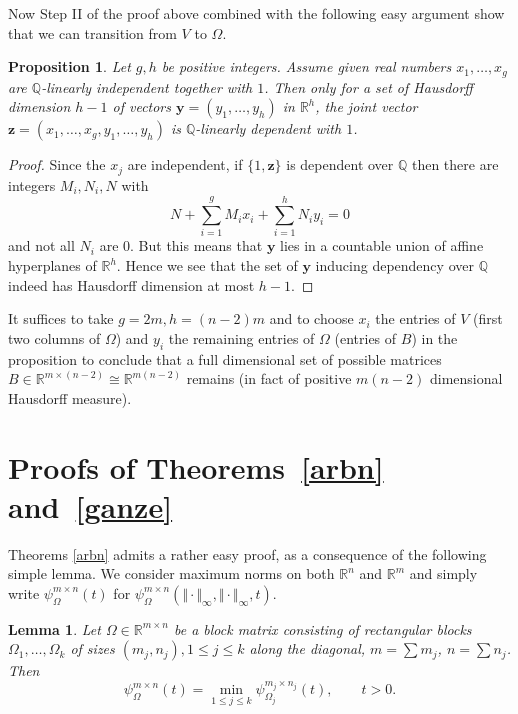 \documentclass[10pt]{amsart}
\newtheorem{lemma}[theorem]{Lemma}
\newtheorem{proposition}{Proposition}
\theoremstyle{definition}
\newcommand{\R}{\mathbb{R}}
\newcommand{\Q}{\mathbb{Q}}
\begin{document}
	Now Step II of the proof above combined with the
	following easy argument show that we can transition from $V$ to $\Omega$.
	
	\begin{proposition}  \label{p}
		Let $g, h$ be positive integers. Assume given real numbers
		$x_1, \ldots,x_g$ are $\Q$-linearly independent together with $1$. 
		Then only for a set of Hausdorff dimension $h-1$ of vectors
		$\boldsymbol{y}=(y_1,\ldots,y_h)$ in $\R^h$, the joint vector $\boldsymbol{z}=(x_1,\ldots,x_g,y_1,\ldots,y_h)$ is $\Q$-linearly dependent with $1$.
	\end{proposition}

\begin{proof}
	Since the $x_j$ are independent, if $\{ 1,\boldsymbol{z}\}$ is 
	dependent over $\Q$ then
	there are integers $M_i, N_i, N$ with
	\[
	N+ \sum_{i=1}^{g} M_i x_i +\sum_{i=1}^{h} N_i y_i = 0
	\]
	and not all $N_i$ are $0$. But this means that $\boldsymbol{y}$ lies
	in a countable union of affine hyperplanes of $\R^{h}$. Hence 
	we see that the set of $\boldsymbol{y}$ inducing dependency over $\Q$
	indeed has Hausdorff dimension at most $h-1$.
	\end{proof}
	
It suffices to take $g=2m, h=(n-2)m$ and to choose $x_i$ the entries of $V$ (first two columns of $\Omega$)
and $y_i$ the remaining entries of $\Omega$ (entries of $B$) in the proposition to conclude
that a full dimensional set of possible matrices $B\in \R^{m\times (n-2)}\cong \R^{m(n-2)}$ remains (in fact of positive $m(n-2)$ dimensional
Hausdorff measure).



\section{Proofs of Theorems~\ref{arbn} and~\ref{ganze} } \label{Sect9}



Theorems \ref{arbn} admits a rather easy proof, as a consequence of the following simple lemma. We consider maximum norms on both $\R^n$ and $\R^m$
and simply write $\psi^{m\times n}_{\Omega}(t)$
for $\psi^{m\times n}_{\Omega}(\Vert \cdot\Vert_{\infty},\Vert \cdot \Vert_{\infty},t)$.

\begin{lemma}  \label{llemma}
    Let $\Omega\in\R^{m\times n}$ be a block matrix
    consisting of rectangular blocks $\Omega_1,\ldots,\Omega_k$ 
    of sizes $(m_j,n_j), 1\le j\le k$
    along the diagonal, $m=\sum m_j$, $n=\sum n_j$.  
    Then
    \[
    \psi_{\Omega}^{m\times n}(t)= 
    \min_{1\leq j \leq k} \psi_{\Omega_j}^{m_j\times n_j}(t), \qquad t>0.
    \]
\end{lemma}
\end{document}
